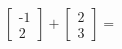 \documentclass[preview]{standalone}
\begin{document}
\begin{align*}
\begin{bmatrix} \text{-}1 \\ 2 \end{bmatrix} + \begin{bmatrix} 2 \\ 3 \end{bmatrix} =
\end{align*}
\end{document}
